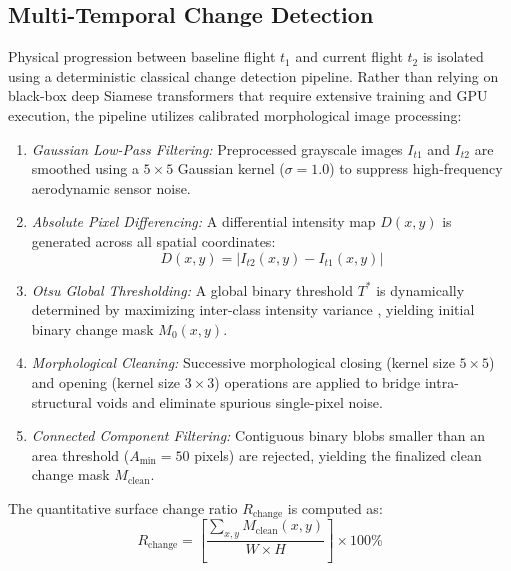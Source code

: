 \documentclass[conference]{IEEEtran}
\begin{document}
\subsection{Multi-Temporal Change Detection}
Physical progression between baseline flight $t_1$ and current flight $t_2$ is isolated using a deterministic classical change detection pipeline. Rather than relying on black-box deep Siamese transformers that require extensive training and GPU execution, the pipeline utilizes calibrated morphological image processing:
\begin{enumerate}
    \item \textit{Gaussian Low-Pass Filtering:} Preprocessed grayscale images $I_{t1}$ and $I_{t2}$ are smoothed using a $5 \times 5$ Gaussian kernel ($\sigma = 1.0$) to suppress high-frequency aerodynamic sensor noise.
    \item \textit{Absolute Pixel Differencing:} A differential intensity map $D(x,y)$ is generated across all spatial coordinates:
    \begin{equation}
        D(x,y) = |I_{t2}(x,y) - I_{t1}(x,y)|
        \label{eq:diff}
    \end{equation}
    \item \textit{Otsu Global Thresholding:} A global binary threshold $T^*$ is dynamically determined by maximizing inter-class intensity variance \cite{otsu1979threshold}, yielding initial binary change mask $M_0(x,y)$.
    \item \textit{Morphological Cleaning:} Successive morphological closing (kernel size $5 \times 5$) and opening (kernel size $3 \times 3$) operations are applied to bridge intra-structural voids and eliminate spurious single-pixel noise.
    \item \textit{Connected Component Filtering:} Contiguous binary blobs smaller than an area threshold ($A_{\text{min}} = 50$ pixels) are rejected, yielding the finalized clean change mask $M_{\text{clean}}$.
\end{enumerate}

The quantitative surface change ratio $R_{\text{change}}$ is computed as:
\begin{equation}
    R_{\text{change}} = \left[ \frac{\sum_{x,y} M_{\text{clean}}(x,y)}{W \times H} \right] \times 100\%
    \label{eq:change_ratio}
\end{equation}
\end{document}
